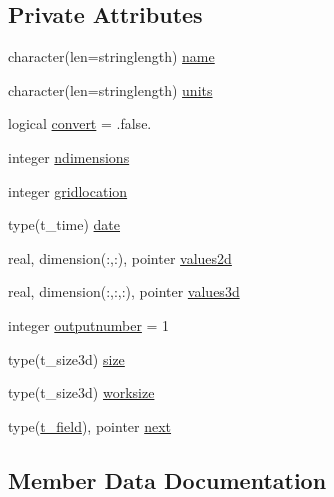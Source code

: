 \subsection*{Private Attributes}
\begin{DoxyCompactItemize}
\item 
character(len=stringlength) \mbox{\hyperlink{structmodulewoaformat_1_1t__field_a84f27e971936dd57eac7234720e2728d}{name}}
\item 
character(len=stringlength) \mbox{\hyperlink{structmodulewoaformat_1_1t__field_a0e8d50e838a4d383621de2ae1d2251e9}{units}}
\item 
logical \mbox{\hyperlink{structmodulewoaformat_1_1t__field_ab74d79fbdaef62db16a2516ebe5d267a}{convert}} = .false.
\item 
integer \mbox{\hyperlink{structmodulewoaformat_1_1t__field_af6643dd9840c11696fdc55b4f4d7d0e3}{ndimensions}}
\item 
integer \mbox{\hyperlink{structmodulewoaformat_1_1t__field_a94e79722694d574ad3769a62007bc85c}{gridlocation}}
\item 
type(t\+\_\+time) \mbox{\hyperlink{structmodulewoaformat_1_1t__field_a9d0236de6acaa1574e1e171b46bc730c}{date}}
\item 
real, dimension(\+:,\+:), pointer \mbox{\hyperlink{structmodulewoaformat_1_1t__field_a7eb1076e448c8589170a275583fec537}{values2d}}
\item 
real, dimension(\+:,\+:,\+:), pointer \mbox{\hyperlink{structmodulewoaformat_1_1t__field_af0686c58c2fe6c9da108cbaf50afac14}{values3d}}
\item 
integer \mbox{\hyperlink{structmodulewoaformat_1_1t__field_ace6d6e98602f33d8aab6f63ac44c2f64}{outputnumber}} = 1
\item 
type(t\+\_\+size3d) \mbox{\hyperlink{structmodulewoaformat_1_1t__field_acb56ba24db57b6e7a513866ae464e99f}{size}}
\item 
type(t\+\_\+size3d) \mbox{\hyperlink{structmodulewoaformat_1_1t__field_a54b99e241e8fc1639f5c64d3549df985}{worksize}}
\item 
type(\mbox{\hyperlink{structmodulewoaformat_1_1t__field}{t\+\_\+field}}), pointer \mbox{\hyperlink{structmodulewoaformat_1_1t__field_a0724f7847f13b3caa4a706cddb457d1b}{next}}
\end{DoxyCompactItemize}


\subsection{Member Data Documentation}
\mbox{\label{structmodulewoaformat_1_1t__field_ab74d79fbdaef62db16a2516ebe5d267a}} 
